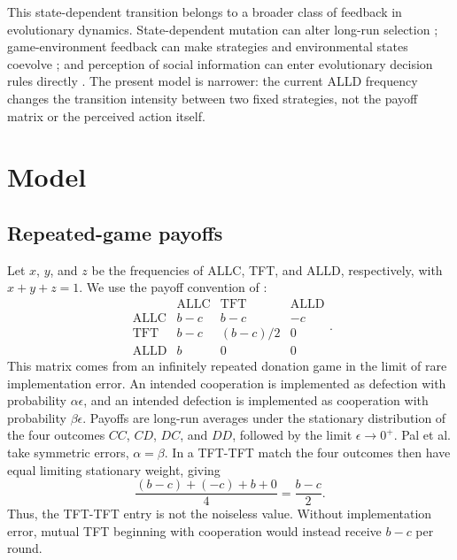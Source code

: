 \documentclass[pdflatex,sn-mathphys-ay]{sn-jnl}
\theoremstyle{thmstyleone}
\begin{document}
This state-dependent transition belongs to a broader class of feedback in evolutionary dynamics. State-dependent mutation can alter long-run selection \citep{bergin1996}; game-environment feedback can make strategies and environmental states coevolve \citep{weitz2016}; and perception of social information can enter evolutionary decision rules directly \citep{salahshour2025}. The present model is narrower: the current ALLD frequency changes the transition intensity between two fixed strategies, not the payoff matrix or the perceived action itself.

\section{Model}

\subsection{Repeated-game payoffs}

Let $x$, $y$, and $z$ be the frequencies of ALLC, TFT, and ALLD, respectively, with $x+y+z=1$. We use the payoff convention of \citet{pal2025}:
\begin{equation}
\label{eq:matrix}
\begin{array}{c|ccc}
 & \mathrm{ALLC} & \mathrm{TFT} & \mathrm{ALLD}\\ \hline
\mathrm{ALLC} & b-c & b-c & -c\\
\mathrm{TFT}  & b-c & (b-c)/2 & 0\\
\mathrm{ALLD} & b   & 0       & 0
\end{array}.
\end{equation}
This matrix comes from an infinitely repeated donation game in the limit of rare implementation error. An intended cooperation is implemented as defection with probability $\alpha\epsilon$, and an intended defection is implemented as cooperation with probability $\beta\epsilon$. Payoffs are long-run averages under the stationary distribution of the four outcomes $CC$, $CD$, $DC$, and $DD$, followed by the limit $\epsilon\to0^+$. Pal et al. take symmetric errors, $\alpha=\beta$. In a TFT-TFT match the four outcomes then have equal limiting stationary weight, giving
\begin{equation}
\frac{(b-c)+(-c)+b+0}{4}=\frac{b-c}{2}.
\end{equation}
Thus, the TFT-TFT entry is not the noiseless value. Without implementation error, mutual TFT beginning with cooperation would instead receive $b-c$ per round.
\end{document}
